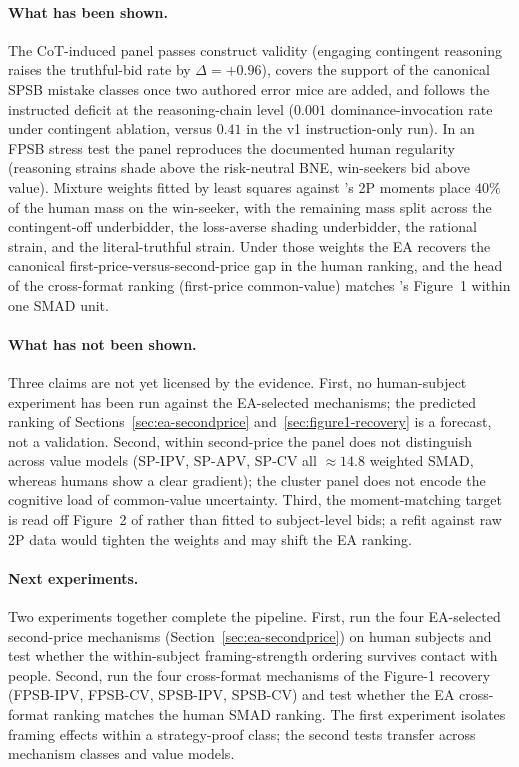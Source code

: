 \documentclass[12pt]{article}
\newcommand{\SPSB}{SPSB}
\begin{document}
\paragraph{What has been shown.} The CoT-induced panel passes
construct validity (engaging contingent reasoning raises the
truthful-bid rate by $\Delta=+0.96$), covers the support of the
canonical \SPSB{} mistake classes once two authored error mice are
added, and follows the instructed deficit at the reasoning-chain
level ($0.001$ dominance-invocation rate under contingent ablation,
versus $0.41$ in the v1 instruction-only run). In an FPSB stress
test the panel reproduces the documented human regularity
(reasoning strains shade above the risk-neutral BNE, win-seekers
bid above value). Mixture weights fitted by least squares against
\citet{li2017}'s 2P moments place $40\%$ of the human mass on the
win-seeker, with the remaining mass split across the contingent-off
underbidder, the loss-averse shading underbidder, the rational
strain, and the literal-truthful strain. Under those weights the EA
recovers the canonical first-price-versus-second-price gap in the
human ranking, and the head of the cross-format ranking
(first-price common-value) matches \citet{zhuLLMAuction2024}'s
Figure~1 within one SMAD unit.

\paragraph{What has not been shown.} Three claims are not yet
licensed by the evidence. First, no human-subject experiment has
been run against the EA-selected mechanisms; the predicted ranking
of Sections~\ref{sec:ea-secondprice} and~\ref{sec:figure1-recovery}
is a forecast, not a validation. Second, within second-price the
panel does not distinguish across value models (SP-IPV, SP-APV,
SP-CV all $\approx 14.8$ weighted SMAD, whereas humans show a clear
gradient); the cluster panel does not encode the cognitive load of
common-value uncertainty. Third, the moment-matching target is
read off Figure~2 of \citet{li2017} rather than fitted to
subject-level bids; a refit against raw 2P data would tighten the
weights and may shift the EA ranking.

\paragraph{Next experiments.} Two experiments together complete
the pipeline. First, run the four EA-selected second-price
mechanisms (Section~\ref{sec:ea-secondprice}) on human subjects and
test whether the within-subject framing-strength ordering survives
contact with people. Second, run the four cross-format mechanisms
of the Figure-1 recovery (FPSB-IPV, FPSB-CV, SPSB-IPV, SPSB-CV)
and test whether the EA cross-format ranking matches the human
SMAD ranking. The first experiment isolates framing effects within
a strategy-proof class; the second tests transfer across mechanism
classes and value models.
\end{document}
